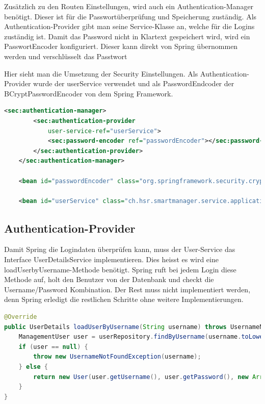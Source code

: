Zusätzlich zu den Routen Einstellungen, wird auch ein Authentication-Manager benötigt. Dieser ist für die Passwortüberprüfung und Speicherung zuständig. Als Authentication-Provider gibt man seine Service-Klasse an, welche für die Logins zuständig ist. Damit das Password nicht in Klartext gespeichert wird, wird ein PasswortEncoder konfiguriert. Dieser kann direkt von Spring übernommen werden und verschlüsselt das Passtwort

Hier sieht man die Umsetzung der Security Einstellungen. Als Authentication-Provider wurde der userService verwendet und als PasswordEndcoder der BCryptPasswordEncoder von dem Spring Framework.
\begin{lstlisting}[language=xml]
<sec:authentication-manager>
		<sec:authentication-provider
			user-service-ref="userService">
			<sec:password-encoder ref="passwordEncoder"></sec:password-encoder>
		</sec:authentication-provider>
	</sec:authentication-manager>
	
	<bean id="passwordEncoder" class="org.springframework.security.crypto.bcrypt.BCryptPasswordEncoder"></bean>
	
	<bean id="userService" class="ch.hsr.smartmanager.service.applicationservices.UserService"></bean>
\end{lstlisting}

\subsection{Authentication-Provider}
Damit Spring die Logindaten überprüfen kann, muss der User-Service das Interface UserDetailsService implementieren. Dies heisst es wird eine loadUserbyUsername-Methode benötigt. Spring ruft bei jedem Login diese Methode auf, holt den Benutzer von der Datenbank und checkt die Username/Password Kombination. Der Rest muss nicht implementiert werden, denn Spring erledigt die restlichen Schritte ohne weitere Implementierungen.
\begin{lstlisting}[language=java]
@Override
public UserDetails loadUserByUsername(String username) throws UsernameNotFoundException {
	ManagementUser user = userRepository.findByUsername(username.toLowerCase());
	if (user == null) {
		throw new UsernameNotFoundException(username);
	} else {
		return new User(user.getUsername(), user.getPassword(), new ArrayList<>());
	}
}
\end{lstlisting}

	

